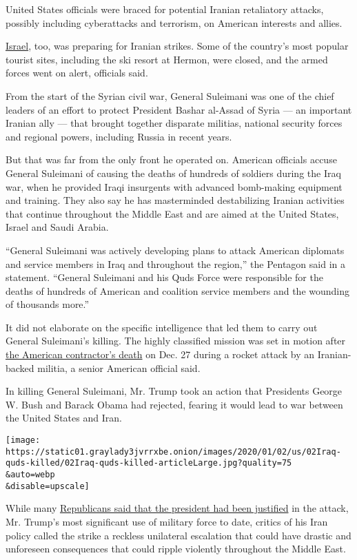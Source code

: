 United States officials were braced for potential Iranian retaliatory
attacks, possibly including cyberattacks and terrorism, on American
interests and allies.

\href{https://www.nytimes3xbfgragh.onion/2020/01/03/world/middleeast/israel-soleimani.html}{Israel},
too, was preparing for Iranian strikes. Some of the country's most
popular tourist sites, including the ski resort at Hermon, were closed,
and the armed forces went on alert, officials said.

From the start of the Syrian civil war, General Suleimani was one of the
chief leaders of an effort to protect President Bashar al-Assad of Syria
--- an important Iranian ally --- that brought together disparate
militias, national security forces and regional powers, including Russia
in recent years.

But that was far from the only front he operated on. American officials
accuse General Suleimani of causing the deaths of hundreds of soldiers
during the Iraq war, when he provided Iraqi insurgents with advanced
bomb-making equipment and training. They also say he has masterminded
destabilizing Iranian activities that continue throughout the Middle
East and are aimed at the United States, Israel and Saudi Arabia.

``General Suleimani was actively developing plans to attack American
diplomats and service members in Iraq and throughout the region,'' the
Pentagon said in a statement. ``General Suleimani and his Quds Force
were responsible for the deaths of hundreds of American and coalition
service members and the wounding of thousands more.''

It did not elaborate on the specific intelligence that led them to carry
out General Suleimani's killing. The highly classified mission was set
in motion after
\href{https://www.nytimes3xbfgragh.onion/2019/12/27/us/politics/american-rocket-attack-iraq.html}{the
American contractor's death} on Dec. 27 during a rocket attack by an
Iranian-backed militia, a senior American official said.

In killing General Suleimani, Mr. Trump took an action that Presidents
George W. Bush and Barack Obama had rejected, fearing it would lead to
war between the United States and Iran.

\texttt{[image: https://static01.graylady3jvrrxbe.onion/images/2020/01/02/us/02Iraq-quds-killed/02Iraq-quds-killed-articleLarge.jpg?quality=75\\\&auto=webp\\\&disable=upscale]}

While many
\href{https://www.nytimes3xbfgragh.onion/2020/01/02/us/politics/us-iran-war.html}{Republicans
said that the president had been justified} in the attack, Mr. Trump's
most significant use of military force to date, critics of his Iran
policy called the strike a reckless unilateral escalation that could
have drastic and unforeseen consequences that could ripple violently
throughout the Middle East.

